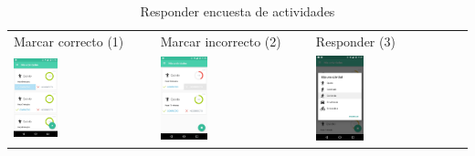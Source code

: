 {\begin{table}[!h]
\begin{tabular}{lll}
\textsf{\relax 
Marcar correcto (1)
} & \textsf{\relax 
Marcar incorrecto (2)
} & \textsf{\relax 
Responder (3)
}\\
    {\includegraphics[width=0.33\textwidth]{anexos/graphics/act_ok.jpg}}
 & 
    {\includegraphics[width=0.33\textwidth]{anexos/graphics/act_nook.jpg}}
 & 
    {\includegraphics[width=0.33\textwidth]{anexos/graphics/act_feed2.jpg}}
\\
\end{tabular}
    \caption{Responder encuesta de actividades}\label{contrib:actres}
\end{table}

}
